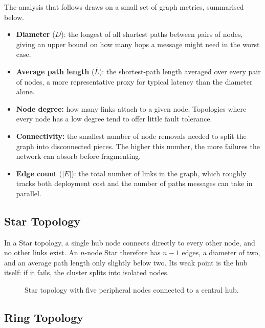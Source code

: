 The analysis that follows draws on a small set of graph metrics, summarised below.

\begin{itemize}
    \item \textbf{Diameter} ($D$): the longest of all shortest paths between pairs of nodes, giving an upper bound on how many hops a message might need in the worst case.
    \item \textbf{Average path length} ($\bar{L}$): the shortest-path length averaged over every pair of nodes, a more representative proxy for typical latency than the diameter alone.
    \item \textbf{Node degree:} how many links attach to a given node. Topologies where every node has a low degree tend to offer little fault tolerance.
    \item \textbf{Connectivity:} the smallest number of node removals needed to split the graph into disconnected pieces. The higher this number, the more failures the network can absorb before fragmenting.
    \item \textbf{Edge count} ($|E|$): the total number of links in the graph, which roughly tracks both deployment cost and the number of paths messages can take in parallel.
\end{itemize}

\subsection{Star Topology}

In a Star topology, a single hub node connects directly to every other node, and no other links exist. An $n$-node Star therefore has $n-1$ edges, a diameter of two, and an average path length only slightly below two. Its weak point is the hub itself: if it fails, the cluster splits into isolated nodes.

\begin{figure}[H]
\centering
{}
\caption{Star topology with five peripheral nodes connected to a central hub.}
\label{fig:topo_star}
\end{figure}

\subsection{Ring Topology}

